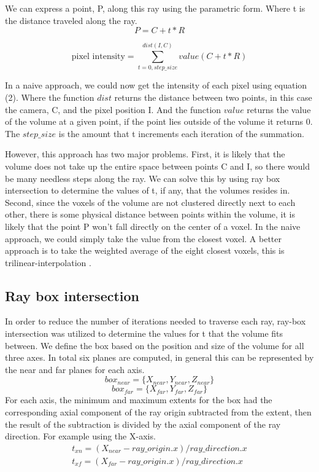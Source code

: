 \documentclass[12pt,twocolumn]{article}
\begin{document}
We can express a point, P, along this ray using the parametric form. Where t is the distance traveled along the ray.
\begin{equation}
  P = C + t * R
\end{equation}


\begin{equation}
  \text{pixel intensity} = \sum_{t=0,step\_size}^{dist(I,C)} value(C+t*R)
\end{equation}

In a naive approach, we could now get the intensity of each pixel using equation (2).
Where the function $dist$ returns the distance between two points, in this case the camera, C, and the pixel position I.
And the function $value$ returns the value of the volume at a given point, if the point lies outside of the volume it 
returns 0.
The $step\_size$ is the amount that t increments each iteration of the summation.

However, this approach has two major problems. 
First, it is likely that the volume does not take up the entire space between 
points C and I, so there would be many needless steps along the ray. We can solve this by using ray box intersection
to determine the values of t, if any, that the volumes resides in. Second, since the voxels of the volume are not 
clustered directly next to each other, there is some physical distance between points within the volume, it is likely 
that the point P won't fall directly on the center of a voxel. In the naive approach, we could simply take the value 
from the closest voxel. A better approach is to take the weighted average of the eight closest voxels, this is 
trilinear-interpolation \cite{Yoder_2003}.

\subsection{Ray box intersection}
In order to reduce the number of iterations needed to traverse each ray, ray-box intersection was utilized to 
determine the values for t that the volume fits between. We define the box based on the position and size of the volume
for all three axes. In total six planes are computed, in general this can be represented by the near and far planes
for each axis.
\begin{equation}
  box_{near} = \{X_{near}, Y_{near}, Z_{near}\}
\end{equation}
\begin{equation}
  box_{far} = \{X_{far}, Y_{far}, Z_{far}\}
\end{equation}
For each axis, the minimum and maximum extents for the box had the corresponding axial component 
of the ray origin subtracted from the extent, then the result of the subtraction is divided by the axial component 
of the ray direction. For example using the X-axis.
\begin{gather*}
  t_{xn} = (X_{near} - ray\_origin.x) / ray\_direction.x\\
  t_{xf} = (X_{far} - ray\_origin.x) / ray\_direction.x
\end{gather*}
\end{document}
